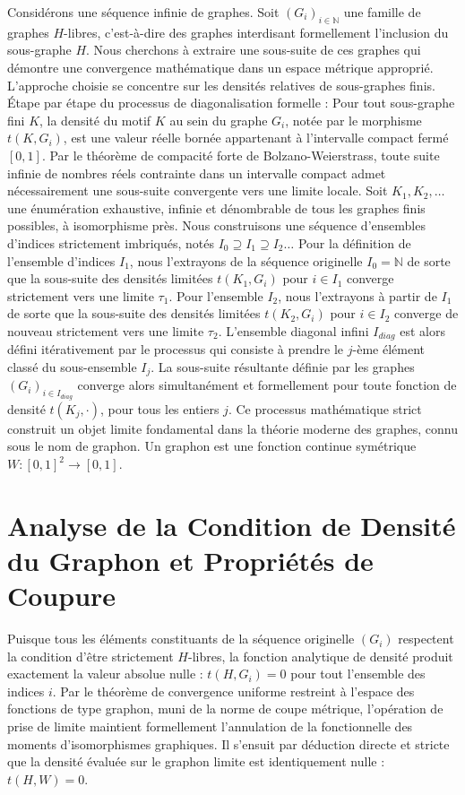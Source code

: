 \documentclass[11pt, a4paper]{article}
\begin{document}
Considérons une séquence infinie de graphes.
Soit $(G_i)_{i \in \mathbb{N}}$ une famille de graphes $H$-libres, c'est-à-dire des graphes interdisant formellement l'inclusion du sous-graphe $H$.
Nous cherchons à extraire une sous-suite de ces graphes qui démontre une convergence mathématique dans un espace métrique approprié. L'approche choisie se concentre sur les densités relatives de sous-graphes finis.
Étape par étape du processus de diagonalisation formelle :
Pour tout sous-graphe fini $K$, la densité du motif $K$ au sein du graphe $G_i$, notée par le morphisme $t(K, G_i)$, est une valeur réelle bornée appartenant à l'intervalle compact fermé $[0, 1]$.
Par le théorème de compacité forte de Bolzano-Weierstrass, toute suite infinie de nombres réels contrainte dans un intervalle compact admet nécessairement une sous-suite convergente vers une limite locale.
Soit $K_1, K_2, \dots$ une énumération exhaustive, infinie et dénombrable de tous les graphes finis possibles, à isomorphisme près.
Nous construisons une séquence d'ensembles d'indices strictement imbriqués, notés $I_0 \supseteq I_1 \supseteq I_2 \dots$
Pour la définition de l'ensemble d'indices $I_1$, nous l'extrayons de la séquence originelle $I_0 = \mathbb{N}$ de sorte que la sous-suite des densités limitées $t(K_1, G_i)$ pour $i \in I_1$ converge strictement vers une limite $\tau_1$.
Pour l'ensemble $I_2$, nous l'extrayons à partir de $I_1$ de sorte que la sous-suite des densités limitées $t(K_2, G_i)$ pour $i \in I_2$ converge de nouveau strictement vers une limite $\tau_2$.
L'ensemble diagonal infini $I_{diag}$ est alors défini itérativement par le processus qui consiste à prendre le $j$-ème élément classé du sous-ensemble $I_j$.
La sous-suite résultante définie par les graphes $(G_i)_{i \in I_{diag}}$ converge alors simultanément et formellement pour toute fonction de densité $t(K_j, \cdot)$, pour tous les entiers $j$.
Ce processus mathématique strict construit un objet limite fondamental dans la théorie moderne des graphes, connu sous le nom de graphon. Un graphon est une fonction continue symétrique $W : [0, 1]^2 \to [0, 1]$.

\section{Analyse de la Condition de Densité du Graphon et Propriétés de Coupure}

Puisque tous les éléments constituants de la séquence originelle $(G_i)$ respectent la condition d'être strictement $H$-libres,
la fonction analytique de densité produit exactement la valeur absolue nulle : $t(H, G_i) = 0$ pour tout l'ensemble des indices $i$.
Par le théorème de convergence uniforme restreint à l'espace des fonctions de type graphon, muni de la norme de coupe métrique, l'opération de prise de limite maintient formellement l'annulation de la fonctionnelle des moments d'isomorphismes graphiques.
Il s'ensuit par déduction directe et stricte que la densité évaluée sur le graphon limite est identiquement nulle : $t(H, W) = 0$.
\end{document}
